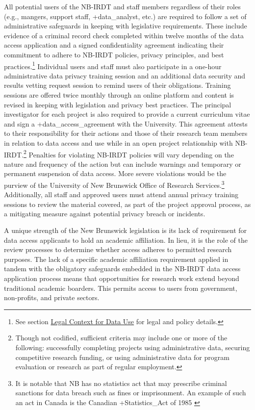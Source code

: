 \documentclass[
]{WileySix}
\begin{document}
All potential users of the NB-IRDT and staff members regardless of their roles (e.g., mangers, support staff, +data\_analyst\textbar, etc.) are required to follow a set of administrative safeguards in keeping with legislative requirements. These include evidence of a criminal record check completed within twelve months of the data access application and a signed confidentiality agreement indicating their commitment to adhere to NB-IRDT policies, privacy principles, and best practices.\footnote{See section \protect\hyperlink{legal-context-for-data-use-8}{Legal Context for Data Use} for legal and policy details.} Individual users and staff must also participate in a one-hour administrative data privacy training session and an additional data security and results vetting request session to remind users of their obligations. Training sessions are offered twice monthly through an online platform and content is revised in keeping with legislation and privacy best practices. The principal investigator for each project is also required to provide a current curriculum vitae and sign a +data\_access\_agreement\textbar{} with the University. This agreement attests to their responsibility for their actions and those of their research team members in relation to data access and use while in an open project relationship with NB-IRDT.\footnote{Though not codified, sufficient criteria may include one or more of the following: successfully completing projects using administrative data, securing competitive research funding, or using administrative data for program evaluation or research as part of regular employment.} Penalties for violating NB-IRDT policies will vary depending on the nature and frequency of the action but can include warnings and temporary or permanent suspension of data access. More severe violations would be the purview of the University of New Brunswick Office of Research Services.\footnote{It is notable that NB has no statistics act that may prescribe criminal sanctions for data breach such as fines or imprisonment. An example of such an act in Canada is the Canadian +Statistics\_Act\textbar{} of 1985 \citep{governmentofcanada1985}} Additionally, all staff and approved users must attend annual privacy training sessions to review the material covered, as part of the project approval process, as a mitigating measure against potential privacy breach or incidents.

A unique strength of the New Brunswick legislation is its lack of requirement for data access applicants to hold an academic affiliation. In lieu, it is the role of the review processes to determine whether access adheres to permitted research purposes. The lack of a specific academic affiliation requirement applied in tandem with the obligatory safeguards embedded in the NB-IRDT data access application process means that opportunities for research work extend beyond traditional academic boarders. This permits access to users from government, non-profits, and private sectors.
\end{document}
